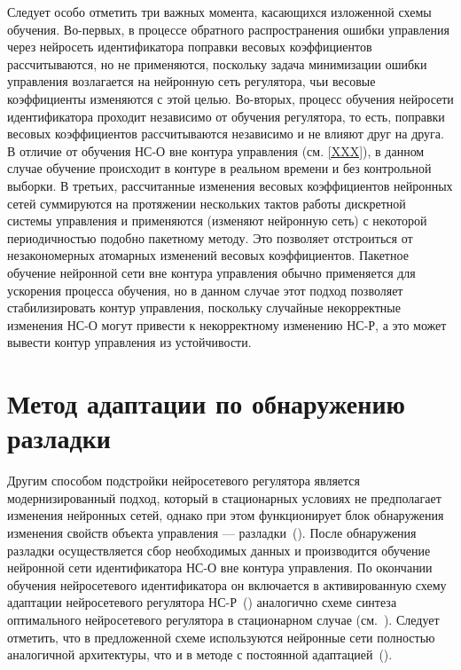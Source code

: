 Следует особо отметить три важных момента, касающихся изложенной схемы
обучения.  Во-первых, в процессе обратного распространения ошибки
управления через нейросеть идентификатора поправки весовых
коэффициентов рассчитываются, но не применяются, поскольку задача
минимизации ошибки управления возлагается на нейронную сеть
регулятора, чьи весовые коэффициенты изменяются с этой целью.
Во-вторых, процесс обучения нейросети идентификатора проходит
независимо от обучения регулятора, то есть, поправки весовых
коэффициентов рассчитываются независимо и не влияют друг на друга.  В
отличие от обучения НС-О вне контура управления (см. \ref{XXX}), в
данном случае обучение происходит в контуре в реальном времени и без
контрольной выборки.  В третьих, рассчитанные изменения весовых
коэффициентов нейронных сетей суммируются на протяжении нескольких
тактов работы дискретной системы управления и применяются (изменяют
нейронную сеть) с некоторой периодичностью подобно пакетному методу.
Это позволяет отстроиться от незакономерных атомарных изменений
весовых коэффициентов.  Пакетное обучение нейронной сети вне контура
управления обычно применяется для ускорения процесса обучения, но в
данном случае этот подход позволяет стабилизировать контур управления,
поскольку случайные некорректные изменения НС-О могут привести к
некорректному изменению НС-Р, а это может вывести контур управления из
устойчивости.

\section{Метод адаптации по обнаружению разладки}

Другим способом подстройки нейросетевого регулятора является
модернизированный подход, который в стационарных условиях не
предполагает изменения нейронных сетей, однако при этом функционирует
блок обнаружения изменения свойств объекта управления ---
разладки~().  После обнаружения разладки
осуществляется сбор необходимых данных и производится обучение
нейронной сети идентификатора НС-О вне контура управления.  По
окончании обучения нейросетевого идентификатора он включается в
активированную схему адаптации нейросетевого регулятора
НС-Р~() аналогично схеме синтеза
оптимального нейросетевого регулятора в стационарном случае
(см.~\cite{XXX}).  Следует отметить, что в предложенной схеме
используются нейронные сети полностью аналогичной архитектуры, что и в
методе с постоянной адаптацией~().

